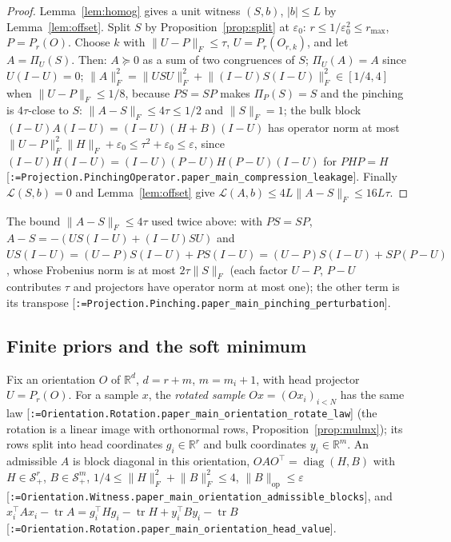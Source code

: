 \documentclass[11pt]{article}
\makeatletter
\newcommand{\formal@break}[1]{\@tfor\formal@tok:=#1\do{%
  \formal@tok
  \expandafter\ifx\formal@tok.\allowbreak\else
  \expandafter\ifx\formal@tok\_\allowbreak\fi\fi}}
\DeclareRobustCommand{\formal}[1]{\textnormal{[\texttt{\small\formal@break{#1}}]}}
\newcommand{\R}{\mathbb{R}}
\newcommand{\Spsd}{\mathcal{S}_{+}}
\newcommand{\norm}[1]{\lVert #1\rVert}
\newcommand{\abs}[1]{\lvert #1\rvert}
\newcommand{\tr}{\operatorname{tr}}
\newcommand{\op}{\mathrm{op}}
\newcommand{\Fro}{F}
\newcommand{\Id}{I}
\newcommand{\diag}{\operatorname{diag}}
\theoremstyle{plain}
\theoremstyle{definition}
\makeatother
\begin{document}
\begin{proof}
Lemma~\ref{lem:homog} gives a unit witness $(S, b)$, $\abs{b} \le L$ by
Lemma~\ref{lem:offset}. Split $S$ by Proposition~\ref{prop:split} at
$\varepsilon_0$: $r \le 1/\varepsilon_0^2 \le r_{\max}$, $P = P_r(O)$. Choose
$k$ with $\norm{U - P}_\Fro \le \tau$, $U = P_r(O_{r,k})$, and let
$A = \Pi_U(S)$. Then: $A \succeq 0$ as a sum of two congruences of $S$;
$\Pi_U(A) = A$ since $U(\Id - U) = 0$; $\norm{A}_\Fro^2 = \norm{USU}_\Fro^2 + \norm{(\Id-U)S(\Id-U)}_\Fro^2 \in [1/4, 4]$
when $\norm{U - P}_\Fro \le 1/8$, because $PS = SP$ makes $\Pi_P(S) = S$ and
the pinching is $4\tau$-close to $S$: $\norm{A - S}_\Fro \le 4\tau \le 1/2$
and $\norm{S}_\Fro = 1$; the bulk block
$(\Id - U)A(\Id - U) = (\Id - U)(H + B)(\Id - U)$ has operator norm at most
$\norm{U - P}_\Fro^2\norm{H}_\Fro + \varepsilon_0 \le \tau^2 + \varepsilon_0 \le \varepsilon$,
since $(\Id - U)H(\Id - U) = (\Id - U)(P - U)H(P - U)(\Id - U)$ for $PHP = H$
\formal{Projection.PinchingOperator.paper\_main\_compression\_leakage}. Finally
$\mathcal{L}(S, b) = 0$ and Lemma~\ref{lem:offset} give
$\mathcal{L}(A, b) \le 4L\norm{A - S}_\Fro \le 16L\tau$.
\end{proof}

The bound $\norm{A - S}_\Fro \le 4\tau$ used twice above: with $PS = SP$,
$A - S = -(US(\Id - U) + (\Id - U)SU)$ and
$US(\Id - U) = (U - P)S(\Id - U) + PS(\Id - U) = (U - P)S(\Id - U) + SP(P - U)$,
whose Frobenius norm is at most $2\tau\norm{S}_\Fro$ (each factor $U - P$,
$P - U$ contributes $\tau$ and projectors have operator norm at most one);
the other term is its transpose \formal{Projection.Pinching.paper\_main\_pinching\_perturbation}.

\subsection{Finite priors and the soft minimum}\label{sec:prior}

Fix an orientation $O$ of $\R^d$, $d = r + m$, $m = m_i + 1$, with head
projector $U = P_r(O)$. For a sample $x$, the \emph{rotated sample}
$Ox = (Ox_i)_{i<N}$ has the same law \formal{Orientation.Rotation.paper\_main\_orientation\_rotate\_law}
(the rotation is a linear image with orthonormal rows, Proposition~\ref{prop:mulmx});
its rows split into head coordinates $g_i \in \R^r$ and bulk coordinates
$y_i \in \R^m$. An admissible $A$ is block diagonal in this orientation,
$O A O^{\top} = \diag(H, B)$ with $H \in \Spsd^r$, $B \in \Spsd^m$,
$1/4 \le \norm{H}_\Fro^2 + \norm{B}_\Fro^2 \le 4$, $\norm{B}_\op \le \varepsilon$
\formal{Orientation.Witness.paper\_main\_orientation\_admissible\_blocks},
and $x_i^{\top}Ax_i - \tr A = g_i^{\top}Hg_i - \tr H + y_i^{\top}By_i - \tr B$
\formal{Orientation.Rotation.paper\_main\_orientation\_head\_value}.
\end{document}

